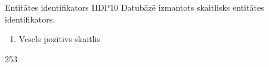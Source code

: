 {Entitātes identifikators}
{IIDP10}
{
	Datubāzē izmantots skaitlisks entitātes identifikators.
}
{
	\begin{enumerate}
		\item Vesels pozitīvs skaitlis
	\end{enumerate}
}
{
	253
}
